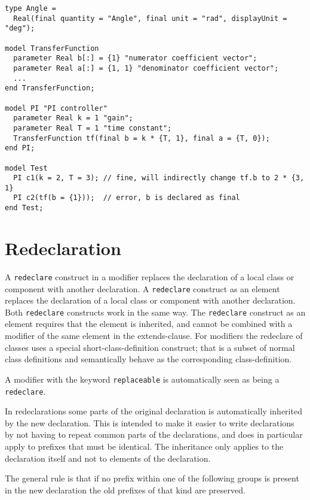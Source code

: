 \begin{example}
\begin{lstlisting}[language=modelica]
type Angle =
  Real(final quantity = "Angle", final unit = "rad", displayUnit = "deg");

model TransferFunction
  parameter Real b[:] = {1} "numerator coefficient vector";
  parameter Real a[:] = {1, 1} "denominator coefficient vector";
  ...
end TransferFunction;

model PI "PI controller"
  parameter Real k = 1 "gain";
  parameter Real T = 1 "time constant";
  TransferFunction tf(final b = k * {T, 1}, final a = {T, 0});
end PI;

model Test
  PI c1(k = 2, T = 3); // fine, will indirectly change tf.b to 2 * {3, 1}
  PI c2(tf(b = {1}));  // error, b is declared as final
end Test;
\end{lstlisting}
\end{example}

\section{Redeclaration}\label{redeclaration}

A \lstinline!redeclare! construct in a modifier replaces the declaration of a local class or component with another declaration.  A \lstinline!redeclare! construct as an element replaces the declaration of a local class or component with another declaration.  Both \lstinline!redeclare! constructs work in the same way.  The \lstinline!redeclare! construct as an element requires that the element is inherited, and cannot be combined with a modifier of the same element in the extends-clause.  For modifiers the redeclare of classes uses a special short-class-definition construct; that is a subset of normal class definitions and semantically behave as the corresponding class-definition.

A modifier with the keyword \lstinline!replaceable! is automatically seen as being a \lstinline!redeclare!.

In redeclarations some parts of the original declaration is
automatically inherited by the new declaration. This is intended to make
it easier to write declarations by not having to repeat common parts of
the declarations, and does in particular apply to prefixes that must be
identical. The inheritance only applies to the declaration itself and
not to elements of the declaration.

The general rule is that if no prefix within one of the following groups
is present in the new declaration the old prefixes of that kind are
preserved.

